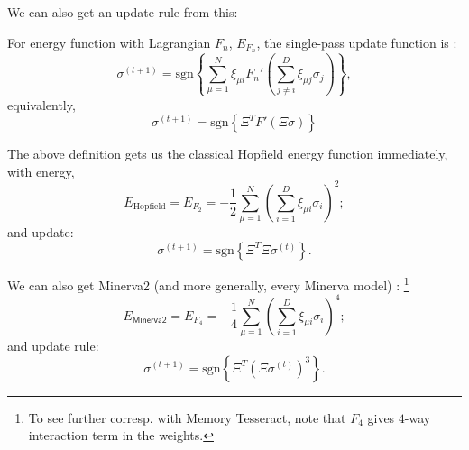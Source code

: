 \documentclass{beamer}
\begin{document}
\begin{frame}
We can also get an update rule from this:
\begin{definition}
    For energy function with Lagrangian $F_n$, $E_{F_n}$, the single-pass update
    function is \parencites{krotov_dense_2016,krotov_hierarchical_2021,demircigil_model_2017}:
    $$
    \sigma^{(t+1)} = \text{sgn} \left\{ \sum^N_{\mu=1} \xi_{\mu i} F_n' \left( \sum^D_{j \neq i} \xi_{\mu j} \sigma_j\right) \right\},
    $$
    equivalently,
    $$
    \sigma^{(t+1)} = \text{sgn} \left\{ \Xi^T F' \left( \Xi \sigma \right)\right\}
    $$
\end{definition}
    
\end{frame}

\begin{frame}
    \begin{example}
        The above definition gets us the classical Hopfield energy function immediately,
        with energy,
        $$
        E_\text{Hopfield} = E_{F_2} = - \frac{1}{2} \sum^N_{\mu=1} \left( \sum^D_{i=1} \xi_{\mu i} \sigma_i  \right)^2;
        $$
        and update:
        $$
        \sigma^{(t+1)} = \text{sgn}\left\{ \Xi^T \Xi \sigma^{(t)} \right\}.
        $$
    \end{example}
\end{frame}

\begin{frame}
    \begin{example}
        We can also get \textsf{Minerva2} (and more generally, every \textsf{Minerva} model)
        \parencites{hintzman_minerva_1984,kelly_memory_2017}:
        \footnote{To see further corresp. with Memory Tesseract, note that $F_4$ gives $4$-way interaction
        term in the weights.}
        $$
        E_\mathsf{Minerva2} = E_{F_4} = - \frac{1}{4} \sum^N_{\mu =1} \left( \sum^D_{i=1} \xi_{\mu i} \sigma_i \right)^4;
        $$
        and update rule:
        $$
        \sigma^{(t+1)} = \text{sgn} \left\{ \Xi^T \left( \Xi \sigma^{(t)} \right)^3 \right\}.
        $$
    \end{example}
\end{frame}
\end{document}
